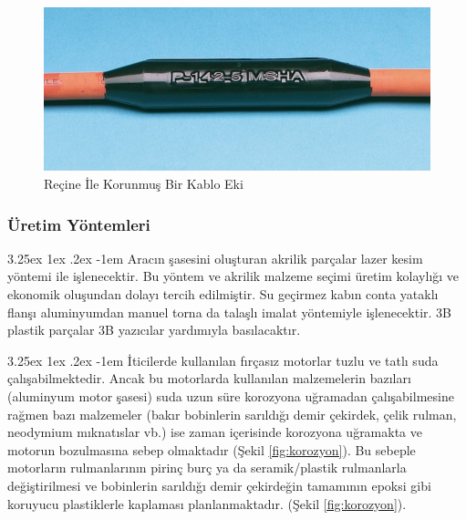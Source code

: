 \documentclass[12pt]{article}
\makeatletter
\renewcommand\paragraph{\@startsection{paragraph}{5}{\z@}%
  {3.25ex \@plus1ex \@minus.2ex}%
  {-1em}%
  {\normalfont\normalsize\bfseries}}
\makeatother
\begin{document}
\newpage

\begin{figure}[hbt!]
\centering
 \begin{adjustbox}{width=10cm}
\includegraphics[width=1\textwidth]{inlinesplice.jpg}
 \end{adjustbox}
\caption{Reçine İle Korunmuş Bir Kablo Eki}
\label{fig:inlinesplice}
\end{figure}

\subsubsection{Üretim Yöntemleri}

\paragraph{} Aracın şasesini oluşturan akrilik parçalar lazer kesim yöntemi ile işlenecektir. Bu yöntem ve akrilik malzeme seçimi üretim kolaylığı ve ekonomik oluşundan dolayı tercih edilmiştir. Su geçirmez kabın conta yataklı flanşı aluminyumdan manuel torna da talaşlı imalat yöntemiyle işlenecektir. 3B plastik parçalar 3B yazıcılar yardımıyla basılacaktır.

\paragraph{} İticilerde kullanılan fırçasız motorlar tuzlu ve tatlı suda çalışabilmektedir. Ancak bu motorlarda kullanılan malzemelerin bazıları (aluminyum motor şasesi) suda uzun süre korozyona uğramadan çalışabilmesine rağmen bazı malzemeler (bakır bobinlerin sarıldığı demir çekirdek, çelik rulman, neodymium mıknatıslar vb.) ise zaman içerisinde korozyona uğramakta ve motorun bozulmasına sebep olmaktadır (Şekil \ref{fig:korozyon}). Bu sebeple motorların rulmanlarının pirinç burç ya da seramik/plastik rulmanlarla değiştirilmesi ve bobinlerin sarıldığı demir çekirdeğin tamamının epoksi gibi koruyucu plastiklerle kaplaması planlanmaktadır. (Şekil \ref{fig:korozyon}). 
\end{document}
